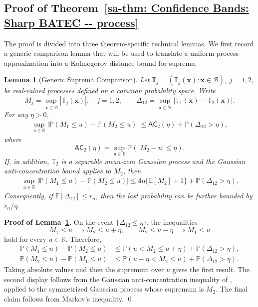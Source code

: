 \documentclass[10pt]{article}
\newtheorem{lem}{Lemma}
\renewcommand{\P}{\mathbb{P}}
\newcommand{\E}{\mathbb{E}}
\newcommand{\reals}{\mathbb{R}}
\newcommand{\bx}{\mathbf{x}}
\newcommand{\B}{\mathcal{B}}
\begin{document}
\subsection{Proof of Theorem~\ref{sa-thm: Confidence Bands: Sharp BATEC -- process}}

The proof is divided into three theorem-specific technical lemmas. We first record a generic comparison lemma that will be used to translate a uniform process approximation into a Kolmogorov distance bound for suprema.

\begin{lem}[Generic Suprema Comparison]\label{sa-lem: generic suprema comparison}
Let $\mathbb{T}_j=(\mathbb{T}_j(\bx):\bx\in\B)$, $j=1,2$, be real-valued processes defined on a common probability space. Write
\[
    M_j=\sup_{\bx\in\B}|\mathbb{T}_j(\bx)|,\quad j=1,2,
    \qquad
    \Delta_{12}=\sup_{\bx\in\B}|\mathbb{T}_1(\bx)-\mathbb{T}_2(\bx)|.
\]
For any $\eta>0$,
\begin{align*}
    \sup_{u\in\reals}\left|\P(M_1\le u)-\P(M_2\le u)\right|
    \le
    \mathsf{AC}_2(\eta)
    +\P(\Delta_{12}>\eta),
\end{align*}
where
\[
    \mathsf{AC}_2(\eta)
    =
    \sup_{u\in\reals}\P(|M_2-u|\le \eta).
\]
If, in addition, $\mathbb{T}_2$ is a separable mean-zero Gaussian process and the Gaussian anti-concentration bound applies to $M_2$, then
\begin{align*}
    \sup_{u\in\reals}\left|\P(M_1\le u)-\P(M_2\le u)\right|
    \le
    4\eta\{\E[M_2]+1\}
    +\P(\Delta_{12}>\eta).
\end{align*}
Consequently, if $\E[\Delta_{12}]\le r_n$, then the last probability can be further bounded by $r_n/\eta$.
\end{lem}

\noindent\textbf{Proof of Lemma~\ref{sa-lem: generic suprema comparison}.}
On the event $\{\Delta_{12}\le\eta\}$, the inequalities
\[
    M_1\le u \implies M_2\le u+\eta,
    \qquad
    M_2\le u-\eta \implies M_1\le u
\]
hold for every $u\in\reals$. Therefore,
\begin{align*}
    \P(M_1\le u)-\P(M_2\le u)
    &\le \P(u<M_2\le u+\eta)
       +\P(\Delta_{12}>\eta),\\
    \P(M_2\le u)-\P(M_1\le u)
    &\le \P(u-\eta<M_2\le u)
       +\P(\Delta_{12}>\eta).
\end{align*}
Taking absolute values and then the supremum over $u$ gives the first result. The second display follows from the Gaussian anti-concentration inequality of \citet[Theorem 2.1]{Chernozhukov-Chetverikov-Kato_2014a_AoS}, applied to the symmetrized Gaussian process whose supremum is $M_2$. The final claim follows from Markov's inequality.
\qed
\end{document}
